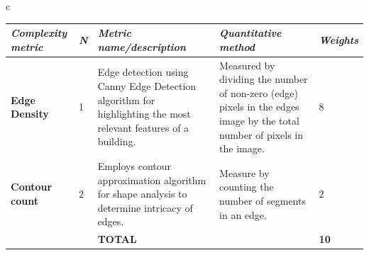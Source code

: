 \documentclass[final,5p,times]{elsarticle}
\begin{document}
    \begin{table}[!htb]
    \centering
    \small
    \begin{tabular}{c}
        \begin{minipage}{\textwidth}
            \centering
            \label{tab:MetricsandWeights}
            \begin{tabularx}{\textwidth}{p{2.5cm} p{1cm} X X p{1cm}}
                \toprule
                \textit{Complexity metric} &
                  \textit{N} &
                  \textit{Metric name/description} &
                  \textit{Quantitative   method} &
                  \textit{Weights} \\ \midrule
                \textbf{Edge Density} &
                  1 &
                  Edge detection using Canny Edge Detection algorithm for highlighting the most relevant features of a building.
                    &
                  Measured by dividing the number of non-zero (edge) pixels in the edges image by the total number of pixels in the image.
                    &
                  8\\
                \textbf{Contour count} &
                  2 &
                  Employs contour approximation algorithm for shape analysis to determine intricacy of edges.
                    &
                  Measure by counting the number of segments in an edge.
                    &
                  2\\ \bottomrule
                   &
                   &
                  \textbf{TOTAL} &
                  &
                  \textbf{10}\\ \bottomrule
            \end{tabularx}
        \end{minipage}
        \\
        \\

\end{tabular}
\end{table}
\end{document}
